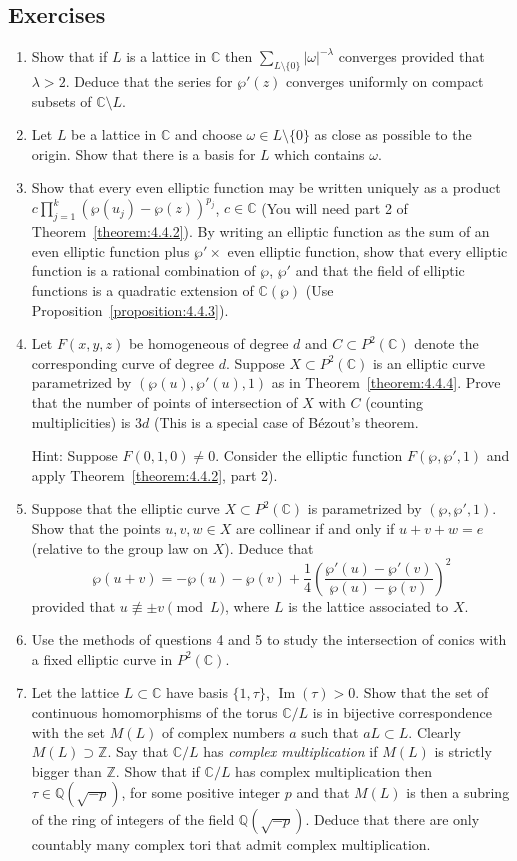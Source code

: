\subsection*{Exercises}
\begin{enumerate}
\item Show that if $L$ is a lattice in $\mathbb C$ then $\sum_{L\setminus\{0\}}|\omega|^{-\lambda}$ converges provided that $\lambda>2$. Deduce that the series for $\wp'(z)$ converges uniformly on compact subsets of $\mathbb C\setminus L$.
\item Let $L$ be a lattice in $\mathbb C$ and choose $\omega\in L\setminus\{0\}$ as close as possible to the origin. Show that there is a basis for $L$ which contains $\omega$.
\item Show that every even elliptic function may be written uniquely as a product $c\prod_{j=1}^k(\wp(u_j)-\wp(z))^{p_j}$, $c\in\mathbb C$ (You will need part 2 of Theorem~\ref{theorem:4.4.2}). By writing an elliptic function as the sum of an even elliptic function plus $\wp'\times{}$ even elliptic function, show that every elliptic function is a rational combination of $\wp$, $\wp'$ and that the field of elliptic functions is a quadratic extension of $\mathbb C(\wp)$ (Use Proposition~\ref{proposition:4.4.3}).
\item Let $F(x,y,z)$ be homogeneous of degree $d$ and $C\subset P^2(\mathbb C)$ denote the corresponding curve of degree $d$. Suppose $X\subset P^2(\mathbb C)$ is an elliptic curve parametrized by $(\wp(u),\wp'(u),1)$ as in Theorem~\ref{theorem:4.4.4}. Prove that the number of points of intersection of $X$ with $C$ (counting multiplicities) is $3d$ (This is a special case of B\'ezout's theorem.\par
Hint: Suppose $F(0,1,0)\neq0$. Consider the elliptic function $F(\wp,\wp',1)$ and apply Theorem~\ref{theorem:4.4.2}, part 2).
\item Suppose that the elliptic curve $X\subset P^2(\mathbb C)$ is parametrized by $(\wp,\wp',1)$. Show that the points $u,v,w\in X$ are collinear if and only if $u+v+w=e$ (relative to the group law on $X$). Deduce that
\[
\wp(u+v)=-\wp(u)-\wp(v)+\frac14\left(\frac{\wp'(u)-\wp'(v)}{\wp(u)-\wp(v)}\right)^2
\]
provided that $u\not\equiv\pm v\pmod L$, where $L$ is the lattice associated to $X$.
\item Use the methods of questions 4 and 5 to study the intersection of conics with a fixed elliptic curve in $P^2(\mathbb C)$.
\item Let the lattice $L\subset\mathbb C$ have basis $\{1,\tau\}$, $\operatorname{Im}(\tau)>0$. Show that the set of continuous homomorphisms of the torus $\mathbb C/L$ is in bijective correspondence with the set $M(L)$ of complex numbers $a$ such that $aL\subset L$. Clearly $M(L)\supset\mathbb Z$. Say that $\mathbb C/L$ has \emph{complex multiplication} if $M(L)$ is strictly bigger than $\mathbb Z$. Show that if $\mathbb C/L$ has complex multiplication then $\tau\in\mathbb Q(\sqrt{-p})$, for some positive integer $p$ and that $M(L)$ is then a subring of the ring of integers of the field $\mathbb Q(\sqrt{-p})$. Deduce that there are only countably many complex tori that admit complex multiplication.

\end{enumerate}

